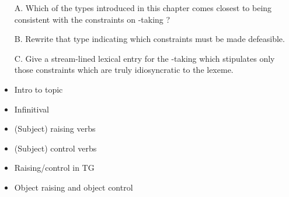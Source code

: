 \documentclass[a4paper,landscape,headrule,footrule]{foils}
\begin{document}
\begin{itemize}
\item[A.] Which of the types introduced in this chapter comes
closest to being consistent with the constraints on -taking
?
\item[B.] Rewrite that type indicating which constraints must
be made defeasible.
\item[C.] Give a stream-lined lexical entry for the -taking
 which stipulates only those constraints which are truly
idiosyncratic to the lexeme.
\end{itemize}




\begin{itemize}
\item Intro to topic
\item Infinitival 
\item (Subject) raising verbs
\item (Subject) control verbs
\item Raising/control in TG
\item Object raising and object control
\end{itemize}



%
\end{document}
